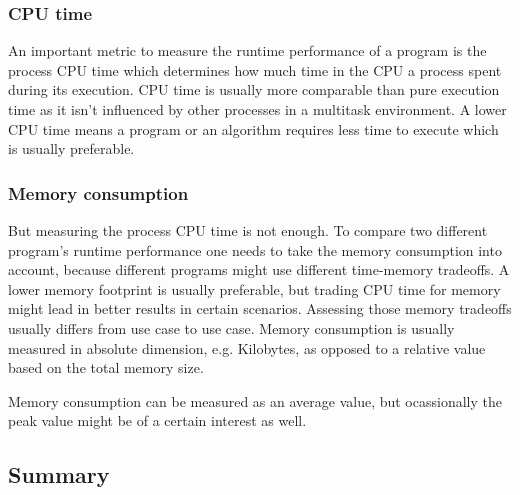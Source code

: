 \subsubsection{CPU time}
An important metric to measure the runtime performance of a program is the process CPU time which determines how much time in the CPU a process spent during its execution. CPU time is usually more comparable than pure execution time as it isn't influenced by other processes in a multitask environment. A lower CPU time means a program or an algorithm requires less time to execute which is usually preferable.

\subsubsection{Memory consumption}
But measuring the process CPU time is not enough. To compare two different program's runtime performance one needs to take the memory consumption into account, because different programs might use different time-memory tradeoffs. A lower memory footprint is usually preferable, but trading CPU time for memory might lead in better results in certain scenarios. Assessing those memory tradeoffs usually differs from use case to use case. Memory consumption is usually measured in absolute dimension, e.g. Kilobytes, as opposed to a relative value based on the total memory size.

Memory consumption can be measured as an average value, but ocassionally the peak value might be of a certain interest as well.

\subsection{Summary}
